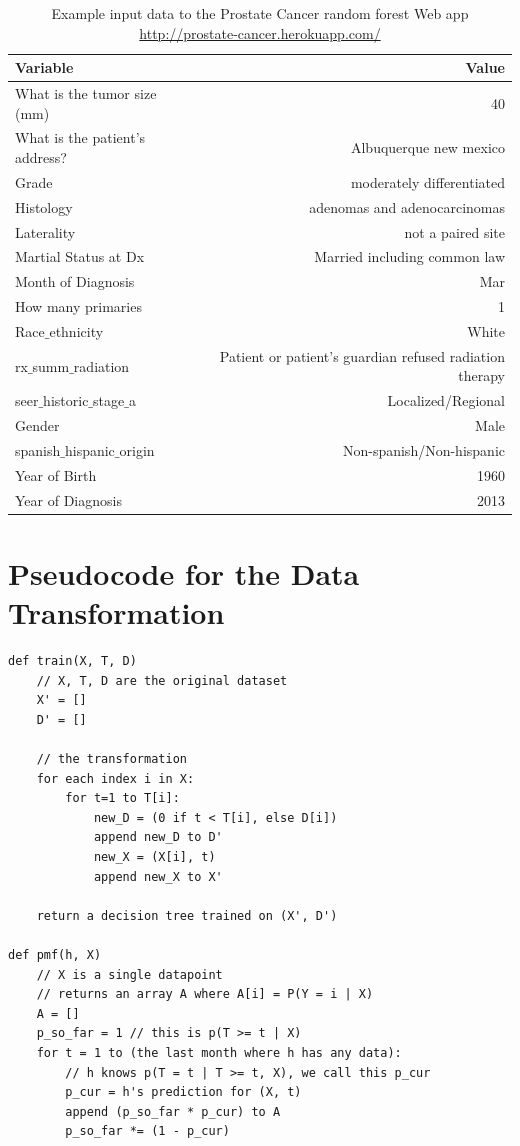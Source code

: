 \documentclass[a4paper,11pt]{article}
\begin{document}
\begin{table}[tbp]
\begin{center}
\begin{tabular}{lr}
  \toprule
  Variable  & Value \\ 
\midrule
  What is the tumor size (mm) & 40 \\  
  What is the patient's address? & Albuquerque new mexico \\ 
  Grade & moderately differentiated \\  
  Histology & adenomas and adenocarcinomas \\ 
  Laterality & not a paired site \\  
 Martial Status at Dx & Married including common law \\  
 Month of Diagnosis & Mar \\  
 How many primaries & 1 \\  
  Race$\_$ethnicity & White \\  
 rx$\_$summ$\_$radiation & Patient or patient's guardian refused radiation therapy \\
  seer$\_$historic$\_$stage$\_$a  & Localized/Regional \\ 
  Gender & Male \\  
  spanish$\_$hispanic$\_$origin & Non-spanish/Non-hispanic \\ 
 Year of Birth & 1960 \\  
  Year of Diagnosis & 2013 \\
\bottomrule
\end{tabular}
\caption{Example input data to the Prostate Cancer random forest Web app \url{http://prostate-cancer.herokuapp.com/}}
\label{tab:abq}
\end{center}
\end{table}


\appendix
\section{Pseudocode for the Data Transformation}
\label{subsec:pseudocode}

\begin{verbatim}
def train(X, T, D)
    // X, T, D are the original dataset
    X' = []
    D' = []

    // the transformation
    for each index i in X:
        for t=1 to T[i]:
            new_D = (0 if t < T[i], else D[i])
            append new_D to D'
            new_X = (X[i], t)
            append new_X to X'

    return a decision tree trained on (X', D')

def pmf(h, X)
    // X is a single datapoint
    // returns an array A where A[i] = P(Y = i | X)
    A = []
    p_so_far = 1 // this is p(T >= t | X)
    for t = 1 to (the last month where h has any data):
        // h knows p(T = t | T >= t, X), we call this p_cur
        p_cur = h's prediction for (X, t)
        append (p_so_far * p_cur) to A
        p_so_far *= (1 - p_cur)

\end{verbatim}




\end{document}
